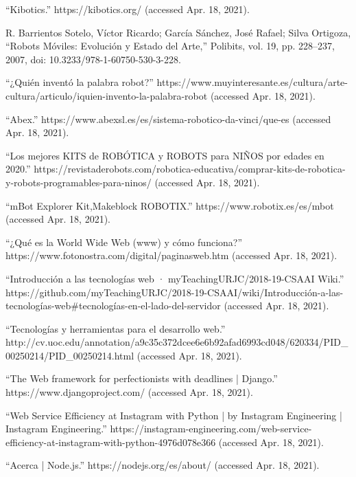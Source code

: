 \begin{thebibliography}{69}

“Kibotics.” https://kibotics.org/ (accessed Apr. 18, 2021).

 R. Barrientos Sotelo, Víctor Ricardo; García Sánchez, José Rafael; Silva Ortigoza, “Robots Móviles: Evolución y Estado del Arte,” Polibits, vol. 19, pp. 228–237, 2007, doi: 10.3233/978-1-60750-530-3-228.

 “¿Quién inventó la palabra robot?” https://www.muyinteresante.es/cultura/arte-cultura/articulo/iquien-invento-la-palabra-robot (accessed Apr. 18, 2021).

	“Abex.” https://www.abexsl.es/es/sistema-robotico-da-vinci/que-es (accessed Apr. 18, 2021).

 “Los mejores KITS de ROBÓTICA y ROBOTS para NIÑOS por edades en 2020.” https://revistaderobots.com/robotica-educativa/comprar-kits-de-robotica-y-robots-programables-para-ninos/ (accessed Apr. 18, 2021).

	“mBot Explorer Kit,Makeblock ROBOTIX.” https://www.robotix.es/es/mbot (accessed Apr. 18, 2021).

	“¿Qué es la World Wide Web (www) y cómo funciona?” https://www.fotonostra.com/digital/paginasweb.htm (accessed Apr. 18, 2021).

 “Introducción a las tecnologías web · myTeachingURJC/2018-19-CSAAI Wiki.” https://github.com/myTeachingURJC/2018-19-CSAAI/wiki/Introducción-a-las-tecnologías-web\#tecnologías-en-el-lado-del-servidor (accessed Apr. 18, 2021).


	“Tecnologías y herramientas para el desarrollo web.” http://cv.uoc.edu/annotation/a9c35c372dcee6e6b92afad6993cd048/620334/PID\_00250214/PID\_00250214.html (accessed Apr. 18, 2021).


	“The Web framework for perfectionists with deadlines | Django.” https://www.djangoproject.com/ (accessed Apr. 18, 2021).

	“Web Service Efficiency at Instagram with Python | by Instagram Engineering | Instagram Engineering.” https://instagram-engineering.com/web-service-efficiency-at-instagram-with-python-4976d078e366  (accessed Apr. 18, 2021).

	“Acerca | Node.js.” https://nodejs.org/es/about/ (accessed Apr. 18, 2021).


\end{thebibliography}
